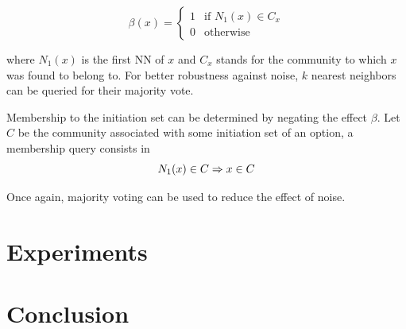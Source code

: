 \documentclass[12pt, oneside, extrafontsizes]{memoir}  %
\theoremstyle{plain}
\theoremstyle{definition}
\begin{document}
\begin{equation}
\beta(x) = 
\begin{cases}
1 & \text{if } N_1(x) \in C_x\\
0 & \text{otherwise}
\end{cases}
\end{equation}

where $N_1(x)$ is the first NN of $x$ and $C_x$ stands for the community to which $x$ was found to belong to. For better robustness against noise, $k$ nearest neighbors can be queried for their majority vote.

Membership to the initiation set can be determined by negating the effect $\beta$. Let $C$ be the community associated with some initiation set of an option, a membership query consists in
\begin{equation}
N_1(x) \in C \Rightarrow x \in C  \\
\end{equation}

Once again, majority voting can be used to reduce the effect of noise. 

\chapter{Experiments}

\chapter{Conclusion}




\end{document}
